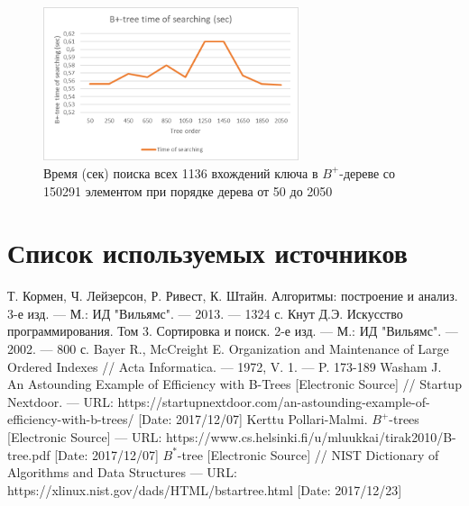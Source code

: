 \documentclass{llncs}
\begin{document}
    \begin{figure}[h!]
    	\centering
    	\includegraphics[width=7.5cm]{BPlusTreeSearchTime}
    	\caption{Время (сек) поиска всех 1136 вхождений ключа в $B^+$-дереве со 150291 элементом при порядке дерева от 50 до 2050}
    	\label{fig:BPlusTreeSearchTime}
    \end{figure}
	
	\section{Список используемых источников}
	
	\begingroup
	\renewcommand{\section}[2]{}
	\begin{thebibliography}{}
		Т. Кормен, Ч. Лейзерсон, Р. Ривест, К. Штайн. Алгоритмы: построение и анализ. 3-е изд. --- М.: ИД "Вильямс". --- 2013. --- 1324 с.
		Кнут Д.Э. Искусство программирования. Том 3. Сортировка и поиск. 2-е изд. --- М.: ИД "Вильямс". --- 2002. --- 800 с.
		Bayer R., McCreight E. Organization and Maintenance of Large Ordered Indexes // Acta Informatica. --- 1972, V. 1. --- P. 173-189
		Washam J. An Astounding Example of Efficiency with B-Trees [Electronic Source] // Startup Nextdoor. --- URL: https://startupnextdoor.com/an-astounding-example-of-efficiency-with-b-trees/ [Date: 2017/12/07]
		Kerttu Pollari-Malmi. $B^+$-trees [Electronic Source] --- URL: https://www.cs.helsinki.fi/u/mluukkai/tirak2010/B-tree.pdf [Date: 2017/12/07]
		$B^*$-tree [Electronic Source] // NIST Dictionary of Algorithms and Data Structures --- URL: https://xlinux.nist.gov/dads/HTML/bstartree.html [Date: 2017/12/23]
	\end{thebibliography}
	
\end{document}

